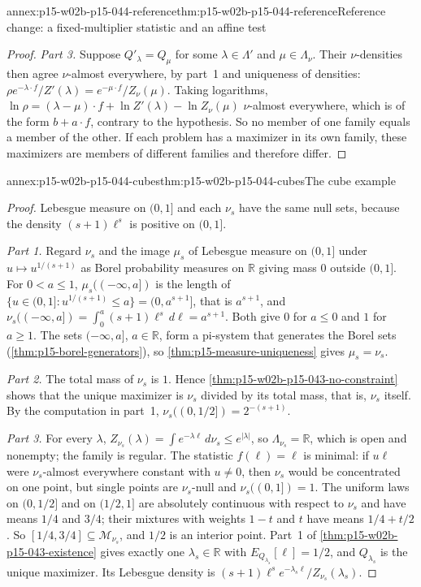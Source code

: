 \begin{annexitem}{annex:p15-w02b-p15-044-reference}{thm:p15-w02b-p15-044-reference}{Reference change: a fixed-multiplier statistic and an affine test}
\begin{proof}
\emph{Part 3.} Suppose \(Q'_\lambda=Q_\mu\) for some \(\lambda\in\Lambda'\)
and \(\mu\in\Lambda_\nu\). Their \(\nu\)-densities then agree \(\nu\)-almost
everywhere, by part~1 and uniqueness of densities:
\(\rho e^{-\lambda\cdot f}/Z'(\lambda)=e^{-\mu\cdot f}/Z_\nu(\mu)\). Taking
logarithms,
\(\ln\rho=(\lambda-\mu)\cdot f+\ln Z'(\lambda)-\ln Z_\nu(\mu)\)
\(\nu\)-almost everywhere, which is of the form \(b+a\cdot f\), contrary to
the hypothesis. So no member of one family equals a member of the other.
If each problem has a maximizer in its own family, these maximizers are
members of different families and therefore differ.
\end{proof}
\end{annexitem}

\begin{annexitem}{annex:p15-w02b-p15-044-cubes}{thm:p15-w02b-p15-044-cubes}{The cube example}
\begin{proof}
Lebesgue measure on \((0,1]\) and each \(\nu_s\) have the same null sets,
because the density \((s+1)\ell^s\) is positive on \((0,1]\).

\emph{Part 1.} Regard \(\nu_s\) and the image \(\mu_s\) of Lebesgue measure
on \((0,1]\) under \(u\mapsto u^{1/(s+1)}\) as Borel probability measures on
\(\mathbb R\) giving mass \(0\) outside \((0,1]\). For \(0<a\leq1\),
\(\mu_s((-\infty,a])\) is the length of
\(\{u\in(0,1]:u^{1/(s+1)}\leq a\}=(0,a^{s+1}]\), that is \(a^{s+1}\), and
\(\nu_s((-\infty,a])=\int_0^a(s+1)\ell^s\,d\ell=a^{s+1}\). Both give \(0\)
for \(a\leq0\) and \(1\) for \(a\geq1\). The sets \((-\infty,a]\),
\(a\in\mathbb R\), form a pi-system that generates the Borel sets
(\cref{thm:p15-borel-generators}), so \cref{thm:p15-measure-uniqueness}
gives \(\mu_s=\nu_s\).

\emph{Part 2.} The total mass of \(\nu_s\) is \(1\). Hence
\cref{thm:p15-w02b-p15-043-no-constraint} shows that the unique maximizer
is \(\nu_s\) divided by its total mass, that is, \(\nu_s\) itself. By the computation in part~1,
\(\nu_s((0,1/2])=2^{-(s+1)}\).

\emph{Part 3.} For every \(\lambda\),
\(Z_{\nu_s}(\lambda)=\int e^{-\lambda\ell}\,d\nu_s\leq e^{|\lambda|}\), so
\(\Lambda_{\nu_s}=\mathbb R\), which is open and nonempty; the family is
regular. The statistic \(f(\ell)=\ell\) is minimal: if \(u\ell\) were
\(\nu_s\)-almost everywhere constant with \(u\neq0\), then \(\nu_s\) would
be concentrated on one point, but single points are \(\nu_s\)-null and
\(\nu_s((0,1])=1\). The uniform laws on \((0,1/2]\) and on \((1/2,1]\) are
absolutely continuous with respect to \(\nu_s\) and have means \(1/4\) and
\(3/4\); their mixtures with weights \(1-t\) and \(t\) have means
\(1/4+t/2\). So \([1/4,3/4]\subseteq\mathcal M_{\nu_s}\), and \(1/2\) is an
interior point. Part~1 of \cref{thm:p15-w02b-p15-043-existence} gives
exactly one \(\lambda_s\in\mathbb R\) with \(E_{Q_{\lambda_s}}[\ell]=1/2\),
and \(Q_{\lambda_s}\) is the unique maximizer. Its Lebesgue density is
\((s+1)\ell^se^{-\lambda_s\ell}/Z_{\nu_s}(\lambda_s)\).


\end{proof}
\end{annexitem}
